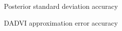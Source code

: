 \documentclass[8pt]{beamer}\usepackage[]{graphicx}\usepackage[]{color}
\begin{document}

\begin{frame}{Posterior standard deviation accuracy}
    \PosteriorSdAccuracy{}
\end{frame}


\begin{frame}{DADVI approximation error accuracy}
    \CoverageHistogram{}
\end{frame}


\end{document}
